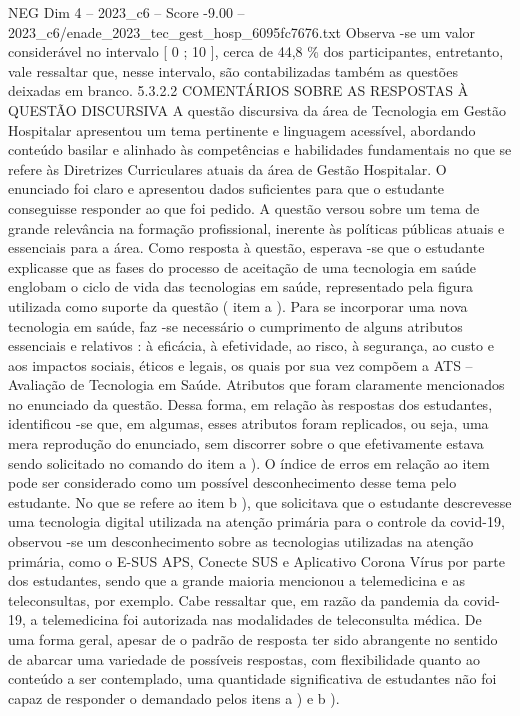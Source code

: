 \begin{textsample}{NEG Dim 4 – 2023\_c6 – Score -9.00 – 2023\_c6/enade\_2023\_tec\_gest\_hosp\_6095fc7676.txt}
Observa -se um valor considerável no intervalo [ 0 ; 10 ], cerca de 44,8 \% dos participantes, entretanto, vale ressaltar que, nesse intervalo, são contabilizadas também as questões deixadas em branco. 5.3.2.2 COMENTÁRIOS SOBRE AS RESPOSTAS À QUESTÃO DISCURSIVA A questão discursiva da área de Tecnologia em Gestão Hospitalar apresentou um tema pertinente e linguagem acessível, abordando conteúdo basilar e alinhado às competências e habilidades fundamentais no que se refere às Diretrizes Curriculares atuais da área de Gestão Hospitalar.
O enunciado foi claro e apresentou dados suficientes para que o estudante conseguisse responder ao que foi pedido.
A questão versou sobre um tema de grande relevância na formação profissional, inerente às políticas públicas atuais e essenciais para a área.
Como resposta à questão, esperava -se que o estudante explicasse que as fases do processo de aceitação de uma tecnologia em saúde englobam o ciclo de vida das tecnologias em saúde, representado pela figura utilizada como suporte da questão ( item a ).
Para se incorporar uma nova tecnologia em saúde, faz -se necessário o cumprimento de alguns atributos essenciais e relativos : à eficácia, à efetividade, ao risco, à segurança, ao custo e aos impactos sociais, éticos e legais, os quais por sua vez compõem a ATS – Avaliação de Tecnologia em Saúde.
Atributos que foram claramente mencionados no enunciado da questão.
Dessa forma, em relação às respostas dos estudantes, identificou -se que, em algumas, esses atributos foram replicados, ou seja, uma mera reprodução do enunciado, sem discorrer sobre o que efetivamente estava sendo solicitado no comando do item a ).
O índice de erros em relação ao item pode ser considerado como um possível desconhecimento desse tema pelo estudante.
No que se refere ao item b ), que solicitava que o estudante descrevesse uma tecnologia digital utilizada na atenção primária para o controle da covid-19, observou -se um desconhecimento sobre as tecnologias utilizadas na atenção primária, como o E-SUS APS, Conecte SUS e Aplicativo Corona Vírus por parte dos estudantes, sendo que a grande maioria mencionou a telemedicina e as teleconsultas, por exemplo.
Cabe ressaltar que, em razão da pandemia da covid-19, a telemedicina foi autorizada nas modalidades de teleconsulta médica.
De uma forma geral, apesar de o padrão de resposta ter sido abrangente no sentido de abarcar uma variedade de possíveis respostas, com flexibilidade quanto ao conteúdo a ser contemplado, uma quantidade significativa de estudantes não foi capaz de responder o demandado pelos itens a ) e b ).

\end{textsample}
